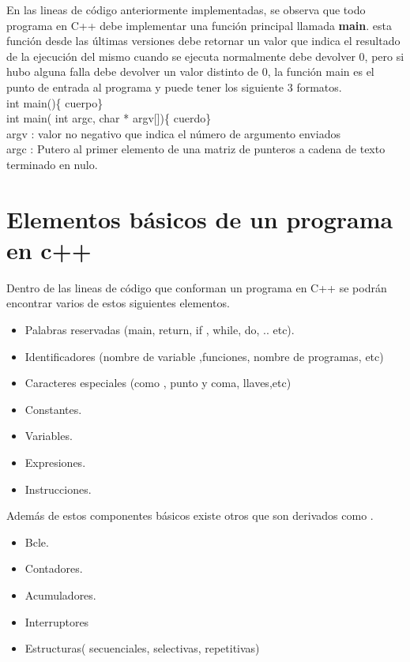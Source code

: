 \documentclass[a4paper,12pt,spanish]{article}
\begin{document}
En las lineas de código anteriormente implementadas, se observa que todo programa en C++ debe
implementar una función principal llamada \textbf{main}. esta función desde las últimas versiones debe retornar un
valor que indica el resultado de la ejecución del mismo cuando
se ejecuta normalmente debe devolver 0, pero si hubo alguna falla
debe devolver un valor distinto de 0, la función main es el punto de entrada al programa y puede tener los siguiente 3 formatos.\\

int main()\{ cuerpo\}\\
int main( int argc, char * argv[])\{ cuerdo\}\\

  argv : valor no negativo que indica el número de argumento enviados\\
  argc : Putero al primer elemento de una matriz de punteros a cadena de texto terminado en nulo.\\

  



\section{Elementos básicos de un programa en c++}
\label{sec:elementos-basicos-de}
Dentro de las lineas de código que conforman un programa en C++ se podrán encontrar varios de estos siguientes elementos.

\begin{itemize}
  \item Palabras reservadas (main, return, if , while, do, .. etc).
  \item Identificadores (nombre de variable ,funciones, nombre de
  programas, etc)
  \item Caracteres especiales (como , punto y coma, llaves,etc)
  \item Constantes. 
  \item Variables.
  \item Expresiones.
  \item Instrucciones.
\end{itemize}

Además de estos componentes básicos existe otros que son derivados
como .
\begin{itemize}
  \item Bcle. 
  \item Contadores.
  \item Acumuladores.
  \item Interruptores 
  \item Estructuras( secuenciales, selectivas, repetitivas)
\end{itemize}
\end{document}
